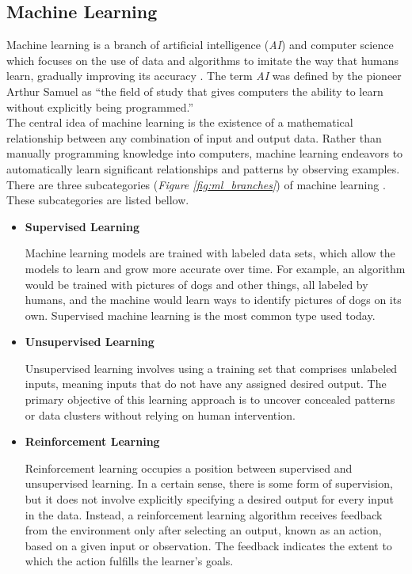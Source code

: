 \newpage

\subsection{Machine Learning}

Machine learning is a branch of artificial intelligence (\textit{AI}) and computer science which focuses on the use of data and algorithms to imitate the way that humans learn, gradually improving its accuracy \cite{IBMMachineLearning}. The term \textit{AI} was defined by the pioneer Arthur Samuel as “the field of study that gives computers the ability to learn without explicitly being programmed.” \\

The central idea of machine learning is the existence of a mathematical relationship between any combination of input and output data. Rather than manually programming knowledge into computers, machine learning endeavors to automatically learn significant relationships and patterns by observing examples. \\

There are three subcategories (\textit{Figure \ref{fig:ml_branches}}) of machine learning \cite{MITML}. These subcategories are listed bellow. \\

\begin{itemize}
\item \textbf{Supervised Learning}

Machine learning models are trained with labeled data sets, which allow the models to learn and grow more accurate over time. For example, an algorithm would be trained with pictures of dogs and other things, all labeled by humans, and the machine would learn ways to identify pictures of dogs on its own. Supervised machine learning is the most common type used today. \\

\item \textbf{Unsupervised Learning}

Unsupervised learning involves using a training set that comprises unlabeled inputs, meaning inputs that do not have any assigned desired output. The primary objective of this learning approach is to uncover concealed patterns or data clusters without relying on human intervention. \\

\item \textbf{Reinforcement Learning}

Reinforcement learning occupies a position between supervised and unsupervised learning. In a certain sense, there is some form of supervision, but it does not involve explicitly specifying a desired output for every input in the data. Instead, a reinforcement learning algorithm receives feedback from the environment only after selecting an output, known as an action, based on a given input or observation. The feedback indicates the extent to which the action fulfills the learner's goals. \\

\end{itemize}

